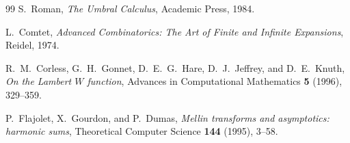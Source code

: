 \documentclass[11pt,oneside]{article}
\numberwithin{equation}{section}
\theoremstyle{definition}
\theoremstyle{remark}
\begin{document}
\begin{thebibliography}{99}
S.~Roman,
\emph{The Umbral Calculus},
Academic Press, 1984.

L.~Comtet,
\emph{Advanced Combinatorics: The Art of Finite and Infinite Expansions},
Reidel, 1974.

R.~M.~Corless, G.~H.~Gonnet, D.~E.~G.~Hare, D.~J.~Jeffrey, and D.~E.~Knuth,
\emph{On the Lambert $W$ function},
Advances in Computational Mathematics \textbf{5} (1996), 329--359.

P.~Flajolet, X.~Gourdon, and P.~Dumas,
\emph{Mellin transforms and asymptotics: harmonic sums},
Theoretical Computer Science \textbf{144} (1995), 3--58.

\end{thebibliography}
\end{document}
